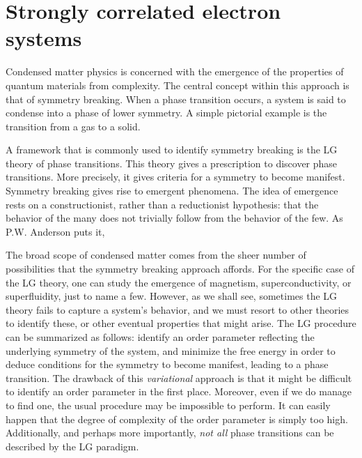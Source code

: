 \section{Strongly correlated electron systems}
\label{sec:strongly_correlated}

Condensed matter physics is concerned with the emergence of the properties of quantum materials from complexity.
The central concept within this approach is that of symmetry breaking.
When a phase transition occurs, a system is said to condense into a phase of lower symmetry.
A simple pictorial example is the transition from a gas to a solid.

A framework that is commonly used to identify symmetry breaking is the \ac{LG} theory of phase transitions.
This theory gives a prescription to discover phase transitions.
More precisely, it gives criteria for a symmetry to become manifest.
Symmetry breaking gives rise to emergent phenomena.
The idea of emergence rests on a constructionist, rather than a reductionist hypothesis: that the behavior of the many does not trivially follow from the behavior of the few.
As P.W. Anderson puts it,  \cite{anderson_more_1972}

The broad scope of condensed matter comes from the sheer number of possibilities that the symmetry breaking approach affords.
For the specific case of the \acs{LG} theory, one can study the emergence of magnetism, superconductivity, or superfluidity, just to name a few.
However, as we shall see, sometimes the \acs{LG} theory fails to capture a system's behavior, and we must resort to other theories to identify these, or other eventual properties that might arise.
The \acl{LG} procedure can be summarized as follows: identify an order parameter reflecting the underlying symmetry of the system, and minimize the free energy in order to deduce conditions for the symmetry to become manifest, leading to a phase transition.
The drawback of this \emph{variational} approach is that it might be difficult to identify an order parameter in the first place.
Moreover, even if we do manage to find one, the usual procedure may be impossible to perform.
It can easily happen that the degree of complexity of the order parameter is simply too high.
Additionally, and perhaps more importantly, \emph{not all} phase transitions can be described by the LG paradigm.

